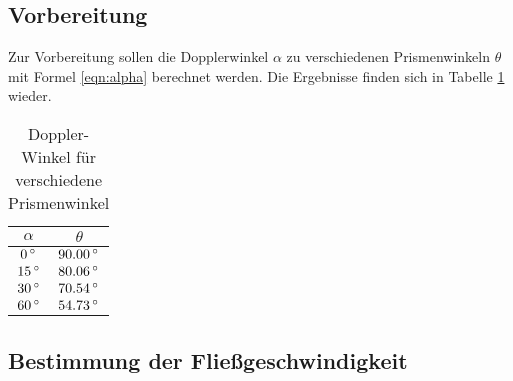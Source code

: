 \subsection{Vorbereitung}
Zur Vorbereitung sollen die Dopplerwinkel $\alpha$ zu verschiedenen Prismenwinkeln
$\theta$
mit Formel \eqref{eqn:alpha} berechnet werden. Die Ergebnisse finden sich in
Tabelle \ref{tab:alpha} wieder.
\begin{table}
  \centering
  \begin{tabular}{c|c}
    \toprule
    $\alpha$ & $\theta$ \\
    \midrule
    $ 0\,\si{\degree}$ & $90.00\,\si{\degree}$ \\
    $15\,\si{\degree}$ & $80.06\,\si{\degree}$ \\
    $30\,\si{\degree}$ & $70.54\,\si{\degree}$ \\
    $60\,\si{\degree}$ & $54.73\,\si{\degree}$ \\
    \bottomrule
  \end{tabular}
  \caption{Doppler-Winkel für verschiedene Prismenwinkel}
  \label{tab:alpha}
\end{table}
\subsection{Bestimmung der Fließgeschwindigkeit}

